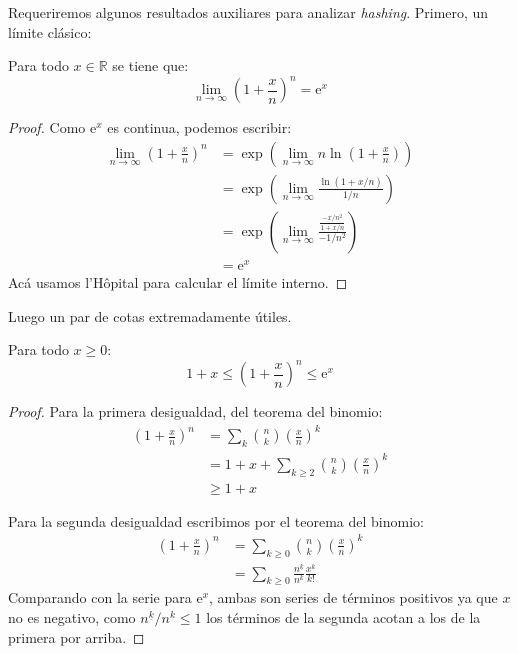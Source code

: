   Requeriremos algunos resultados auxiliares
  para analizar \emph{\foreignlanguage{english}{hashing}}.
  Primero,
  un límite clásico:
  \begin{lemma}
    \label{lem:classic-limit}
    Para todo \(x \in \mathbb{R}\) se tiene que:
    \begin{equation*}
      \lim_{n \to \infty} \left( 1 + \frac{x}{n} \right)^n
        = \mathrm{e}^x
    \end{equation*}
  \end{lemma}
  \begin{proof}
    Como \(\mathrm{e}^x\) es continua,
    podemos escribir:
    \begin{align*}
      \lim_{n \to \infty} \left( 1 + \frac{x}{n} \right)^n
        &= \exp\left(
                 \lim_{n \to \infty} n \ln \left( 1 + \frac{x}{n} \right)
               \right) \\
        &= \exp\left(
                  \lim_{n \to \infty} \frac{\ln (1 + x / n)}{1/n}
               \right) \\
        &= \exp\left(
                  \lim_{n \to \infty}
                   \frac{\frac{- x / n^2}{1 + x / n}}{- 1 / n^2}
               \right) \\
        &= \mathrm{e}^x
    \end{align*}
    Acá usamos l'Hôpital para calcular el límite interno.
  \end{proof}
  Luego un par de cotas extremadamente útiles.
  \begin{lemma}
    \label{lem:bounds-(1+x/n)^n}
    Para todo \(x \ge 0\):
    \begin{equation*}
      1 + x
        \le \left( 1 + \frac{x}{n} \right)^n
        \le \mathrm{e}^x
    \end{equation*}
  \end{lemma}
  \begin{proof}
    Para la primera desigualdad,
    del teorema del binomio:
    \begin{align*}
      \left( 1 + \frac{x}{n} \right)^n
        &=   \sum_k \binom{n}{k} \left( \frac{x}{n} \right)^k \\
        &=   1 + x
               + \sum_{k \ge 2} \binom{n}{k} \left( \frac{x}{n} \right)^k \\
        &\ge 1 + x
    \end{align*}

    Para la segunda desigualdad
    escribimos por el teorema del binomio:
    \begin{align*}
      \left( 1 + \frac{x}{n} \right)^n
        &= \sum_{k \ge 0} \binom{n}{k} \left( \frac{x}{n} \right)^k \\
        &= \sum_{k \ge 0} \frac{n^{\underline{k}}}{n^k} \frac{x^k}{k!}
    \end{align*}
    Comparando con la serie para \(\mathrm{e}^x\),
    ambas son series de términos positivos ya que \(x\) no es negativo,
    como \(n^{\underline{k}} / n^k \le 1\)
    los términos de la segunda acotan a los de la primera por arriba.
  \end{proof}

